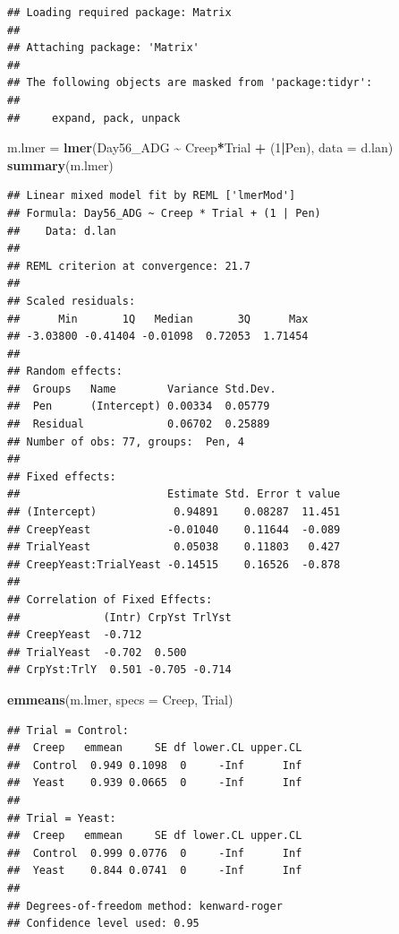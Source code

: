 \documentclass[
]{book}
\newenvironment{Shaded}{\begin{snugshade}}{\end{snugshade}}
\newcommand{\AttributeTok}[1]{\textcolor[rgb]{0.13,0.29,0.53}{#1}}
\newcommand{\DecValTok}[1]{\textcolor[rgb]{0.00,0.00,0.81}{#1}}
\newcommand{\FunctionTok}[1]{\textcolor[rgb]{0.13,0.29,0.53}{\textbf{#1}}}
\newcommand{\NormalTok}[1]{#1}
\newcommand{\OtherTok}[1]{\textcolor[rgb]{0.56,0.35,0.01}{#1}}
\newcommand{\SpecialCharTok}[1]{\textcolor[rgb]{0.81,0.36,0.00}{\textbf{#1}}}
\newcommand{\StringTok}[1]{\textcolor[rgb]{0.31,0.60,0.02}{#1}}
\begin{document}
\begin{verbatim}
## Loading required package: Matrix
## 
## Attaching package: 'Matrix'
## 
## The following objects are masked from 'package:tidyr':
## 
##     expand, pack, unpack
\end{verbatim}

\begin{Shaded}
\begin{Highlighting}[]
\NormalTok{m.lmer }\OtherTok{=} \FunctionTok{lmer}\NormalTok{(Day56\_ADG }\SpecialCharTok{\textasciitilde{}}\NormalTok{ Creep}\SpecialCharTok{*}\NormalTok{Trial }\SpecialCharTok{+}\NormalTok{ (}\DecValTok{1}\SpecialCharTok{|}\NormalTok{Pen), }\AttributeTok{data =}\NormalTok{ d.lan)}
\FunctionTok{summary}\NormalTok{(m.lmer)}
\end{Highlighting}
\end{Shaded}

\begin{verbatim}
## Linear mixed model fit by REML ['lmerMod']
## Formula: Day56_ADG ~ Creep * Trial + (1 | Pen)
##    Data: d.lan
## 
## REML criterion at convergence: 21.7
## 
## Scaled residuals: 
##      Min       1Q   Median       3Q      Max 
## -3.03800 -0.41404 -0.01098  0.72053  1.71454 
## 
## Random effects:
##  Groups   Name        Variance Std.Dev.
##  Pen      (Intercept) 0.00334  0.05779 
##  Residual             0.06702  0.25889 
## Number of obs: 77, groups:  Pen, 4
## 
## Fixed effects:
##                       Estimate Std. Error t value
## (Intercept)            0.94891    0.08287  11.451
## CreepYeast            -0.01040    0.11644  -0.089
## TrialYeast             0.05038    0.11803   0.427
## CreepYeast:TrialYeast -0.14515    0.16526  -0.878
## 
## Correlation of Fixed Effects:
##             (Intr) CrpYst TrlYst
## CreepYeast  -0.712              
## TrialYeast  -0.702  0.500       
## CrpYst:TrlY  0.501 -0.705 -0.714
\end{verbatim}

\begin{Shaded}
\begin{Highlighting}[]
\FunctionTok{emmeans}\NormalTok{(m.lmer, }\AttributeTok{specs =} \StringTok{\textquotesingle{}Creep\textquotesingle{}}\NormalTok{, }\StringTok{\textquotesingle{}Trial\textquotesingle{}}\NormalTok{)}
\end{Highlighting}
\end{Shaded}

\begin{verbatim}
## Trial = Control:
##  Creep   emmean     SE df lower.CL upper.CL
##  Control  0.949 0.1098  0     -Inf      Inf
##  Yeast    0.939 0.0665  0     -Inf      Inf
## 
## Trial = Yeast:
##  Creep   emmean     SE df lower.CL upper.CL
##  Control  0.999 0.0776  0     -Inf      Inf
##  Yeast    0.844 0.0741  0     -Inf      Inf
## 
## Degrees-of-freedom method: kenward-roger 
## Confidence level used: 0.95
\end{verbatim}
\end{document}
